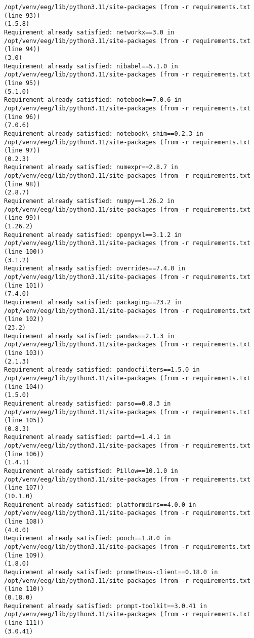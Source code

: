 \documentclass[11pt]{article}
\begin{document}
\begin{Verbatim}[commandchars=\\\{\}]
/opt/venv/eeg/lib/python3.11/site-packages (from -r requirements.txt (line 93))
(1.5.8)
Requirement already satisfied: networkx==3.0 in
/opt/venv/eeg/lib/python3.11/site-packages (from -r requirements.txt (line 94))
(3.0)
Requirement already satisfied: nibabel==5.1.0 in
/opt/venv/eeg/lib/python3.11/site-packages (from -r requirements.txt (line 95))
(5.1.0)
Requirement already satisfied: notebook==7.0.6 in
/opt/venv/eeg/lib/python3.11/site-packages (from -r requirements.txt (line 96))
(7.0.6)
Requirement already satisfied: notebook\_shim==0.2.3 in
/opt/venv/eeg/lib/python3.11/site-packages (from -r requirements.txt (line 97))
(0.2.3)
Requirement already satisfied: numexpr==2.8.7 in
/opt/venv/eeg/lib/python3.11/site-packages (from -r requirements.txt (line 98))
(2.8.7)
Requirement already satisfied: numpy==1.26.2 in
/opt/venv/eeg/lib/python3.11/site-packages (from -r requirements.txt (line 99))
(1.26.2)
Requirement already satisfied: openpyxl==3.1.2 in
/opt/venv/eeg/lib/python3.11/site-packages (from -r requirements.txt (line 100))
(3.1.2)
Requirement already satisfied: overrides==7.4.0 in
/opt/venv/eeg/lib/python3.11/site-packages (from -r requirements.txt (line 101))
(7.4.0)
Requirement already satisfied: packaging==23.2 in
/opt/venv/eeg/lib/python3.11/site-packages (from -r requirements.txt (line 102))
(23.2)
Requirement already satisfied: pandas==2.1.3 in
/opt/venv/eeg/lib/python3.11/site-packages (from -r requirements.txt (line 103))
(2.1.3)
Requirement already satisfied: pandocfilters==1.5.0 in
/opt/venv/eeg/lib/python3.11/site-packages (from -r requirements.txt (line 104))
(1.5.0)
Requirement already satisfied: parso==0.8.3 in
/opt/venv/eeg/lib/python3.11/site-packages (from -r requirements.txt (line 105))
(0.8.3)
Requirement already satisfied: partd==1.4.1 in
/opt/venv/eeg/lib/python3.11/site-packages (from -r requirements.txt (line 106))
(1.4.1)
Requirement already satisfied: Pillow==10.1.0 in
/opt/venv/eeg/lib/python3.11/site-packages (from -r requirements.txt (line 107))
(10.1.0)
Requirement already satisfied: platformdirs==4.0.0 in
/opt/venv/eeg/lib/python3.11/site-packages (from -r requirements.txt (line 108))
(4.0.0)
Requirement already satisfied: pooch==1.8.0 in
/opt/venv/eeg/lib/python3.11/site-packages (from -r requirements.txt (line 109))
(1.8.0)
Requirement already satisfied: prometheus-client==0.18.0 in
/opt/venv/eeg/lib/python3.11/site-packages (from -r requirements.txt (line 110))
(0.18.0)
Requirement already satisfied: prompt-toolkit==3.0.41 in
/opt/venv/eeg/lib/python3.11/site-packages (from -r requirements.txt (line 111))
(3.0.41)

\end{Verbatim}
\end{document}
